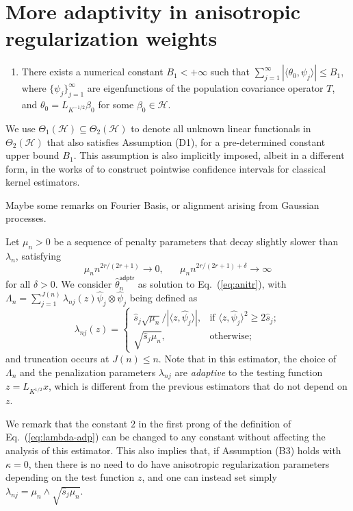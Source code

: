 \documentclass[aos]{imsart}
\renewcommand{\hat}{\widehat}
\newcommand{\mH}{\mathcal H}
\newcommand{\adptr}{\mathsf{adptr}}
\theoremstyle{plain}
\theoremstyle{definition}
\theoremstyle{definition}
\begin{document}
\section{More adaptivity in anisotropic regularization weights}\label{sec:adptr}

\begin{enumerate}
\item[(D1)] There exists a numerical constant $B_1<+\infty$ such that $\sum_{j=1}^{\infty}|\langle \theta_0, \psi_j\rangle| \leq B_1$, where $\{\psi_j\}_{j=1}^{\infty}$ are eigenfunctions of the population covariance operator $T$,
and $\theta_0=L_{K^{-1/2}}\beta_0$ for some $\beta_0\in\mH$.
\end{enumerate}
We use $\Theta_1(\mH)\subseteq\Theta_2(\mH)$ to denote all unknown linear functionals in $\Theta_2(\mH)$ that also satisfies Assumption (D1), for a pre-determined constant upper bound $B_1$.
This assumption is also implicitly imposed, albeit in a different form, in the works of \cite{liu2025scalable} to construct pointwise confidence intervals for classical kernel estimators.

{\color{red}Maybe some remarks on Fourier Basis, or alignment arising from Gaussian processes.}

Let $\mu_n>0$ be a sequence of penalty parameters that decay slightly slower than $\lambda_n$, satisfying
\begin{equation}
\mu_n n^{2r/(2r+1)}\to 0,\;\;\;\;\;\;\mu_n n^{2r/(2r+1)+\delta}\to\infty
\label{eq:mun}
\end{equation}
for all $\delta>0$.
We consider $\hat\theta_n^\adptr$ as solution to Eq.~(\ref{eq:anitr}), with $\Lambda_n=\sum_{j=1}^{J(n)}\lambda_{nj}(z)\hat\psi_j\otimes\hat\psi_j$ being defined as
\begin{equation}
\lambda_{nj}(z) = \left\{\begin{array}{ll}\hat s_j\sqrt{\mu_n}/|\langle z,\hat\psi_j\rangle|,&\text{if } \langle z,\hat\psi_j\rangle^2\geq 2\hat s_j;\\  \sqrt{\hat s_j\mu_n},& \text{otherwise};\end{array}\right.
\label{eq:lambda-adp}
\end{equation}
and truncation occurs at $J(n)\leq n$.
Note that in this estimator, the choice of $\Lambda_n$ and the penalization parameters $\lambda_{nj}$ are \emph{adaptive} to the testing function $z=L_{K^{1/2}}x$,
which is different from the previous estimators that do not depend on $z$.

We remark that the constant $2$ in the first prong of the definition of Eq.~(\ref{eq:lambda-adp}) can be changed to any constant without affecting the analysis of this estimator.
This also implies that, if Assumption (B3) holds with $\kappa=0$, then there is no need to do have anisotropic regularization parameters depending on
the test function $z$, and one can instead set simply $\lambda_{nj}= \mu_n\wedge\sqrt{\hat s_j\mu_n}$.
\end{document}
